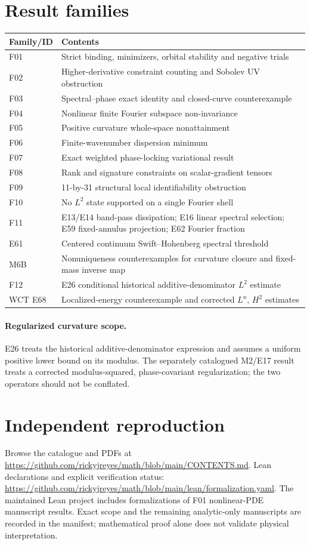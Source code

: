 \documentclass[11pt]{article}
\begin{document}
\section*{Result families}
\begin{longtable}{p{}p{}}
\textbf{Family/ID}&\textbf{Contents}\\\hline
F01&Strict binding, minimizers, orbital stability and negative trials\\
F02&Higher-derivative constraint counting and Sobolev UV obstruction\\
F03&Spectral--phase exact identity and closed-curve counterexample\\
F04&Nonlinear finite Fourier subspace non-invariance\\
F05&Positive curvature whole-space nonattainment\\
F06&Finite-wavenumber dispersion minimum\\
F07&Exact weighted phase-locking variational result\\
F08&Rank and signature constraints on scalar-gradient tensors\\
F09&11-by-31 structural local identifiability obstruction\\
F10&No $L^2$ state supported on a single Fourier shell\\
F11&E13/E14 band-pass dissipation; E16 linear spectral selection; E59 fixed-annulus projection; E62 Fourier fraction\\
E61&Centered continuum Swift--Hohenberg spectral threshold\\
M6B&Nonuniqueness counterexamples for curvature closure and fixed-mass inverse map\\
F12&E26 conditional historical additive-denominator $L^2$ estimate\\
WCT E68&Localized-energy counterexample and corrected $L^n$, $H^2$ estimates\\
\end{longtable}
\paragraph{Regularized curvature scope.}
E26 treats the historical additive-denominator expression and assumes a
uniform positive lower bound on its modulus. The separately catalogued
M2/E17 result treats a corrected modulus-squared, phase-covariant
regularization; the two operators should not be conflated.
\section*{Independent reproduction}
Browse the catalogue and PDFs at
\url{https://github.com/rickyjreyes/math/blob/main/CONTENTS.md}.
Lean declarations and explicit verification status:
\url{https://github.com/rickyjreyes/math/blob/main/lean/formalization.yaml}.
The maintained Lean project includes formalizations of F01 nonlinear-PDE manuscript results. Exact scope and the remaining analytic-only manuscripts are recorded in the manifest; mathematical proof alone does not validate physical interpretation.
\end{document}
